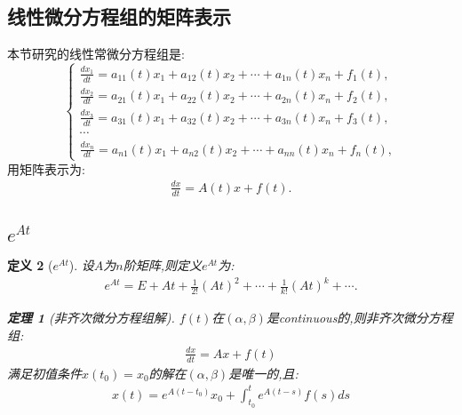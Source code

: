 \documentclass[12pt, a4paper, oneside]{ctexbook}
\newtheorem{theorem}{定理}[section]
\newtheorem{definition}[theorem]{定义}
\begin{document}
        \subsection{线性微分方程组的矩阵表示}
        本节研究的线性常微分方程组是:
            \begin{equation}
                \begin{cases}
                    \frac{dx_1}{dt}=a_{11}(t)x_1+a_{12}(t)x_2+\cdots+a_{1n}(t)x_n+f_1(t),\\
                    \frac{dx_2}{dt}=a_{21}(t)x_1+a_{22}(t)x_2+\cdots+a_{2n}(t)x_n+f_2(t),\\
                    \frac{dx_3}{dt}=a_{31}(t)x_1+a_{32}(t)x_2+\cdots+a_{3n}(t)x_n+f_3(t),\\
                    \cdots\\
                    \frac{dx_n}{dt}=a_{n1}(t)x_1+a_{n2}(t)x_2+\cdots+a_{nn}(t)x_n+f_n(t),
                \end{cases}\label{eq:Linear ODE}
            \end{equation}
        用矩阵表示为:
            \begin{align}
                \frac{d\mathbf{\mathit{x}}}{dt}=\mathbf{\mathit{A}} (t)x+\mathbf{\mathit{f}}(t).
            \end{align}
        \subsection{$e^{\mathbf{\mathit{A}}t}$}
        \begin{definition}[$e^{\mathbf{{\mathit{A}}}t}$]
            设$A$为$n$阶矩阵,则定义$e^{\mathbf{{\mathit{A}}}t}$为:
            \begin{align}
                e^{\mathbf{{\mathit{A}}}t}=E+At+\frac{1}{2!}(At)^2+\cdots+\frac{1}{k!}(At)^k+\cdots.
            \end{align}
        \begin{theorem}[非齐次微分方程组解]
            $f(t)$在$(\alpha,\beta)$是continuous的,则非齐次微分方程组:
            \begin{align}
                \frac{d\mathbf{\mathit{x}}}{dt}=A\mathbf{\mathit{x}}+\mathbf{\mathit{f}}(t)
            \end{align}
            满足初值条件$\mathbf{\mathit{x}}(t_0)=\mathbf{\mathit{x_0}}$的解在$(\alpha,\beta)$是唯一的,且:
            \begin{align}
                \mathbf{\mathit{x(t)}}=e^{A(t-t_0)}\mathbf{\mathit{x_0}}+\int_{t_0}^{t}e^{A(t-s)}\mathbf{\mathit{f}}(s)ds
            \end{align}
        \end{theorem}
            
        \end{definition}
\end{document}
